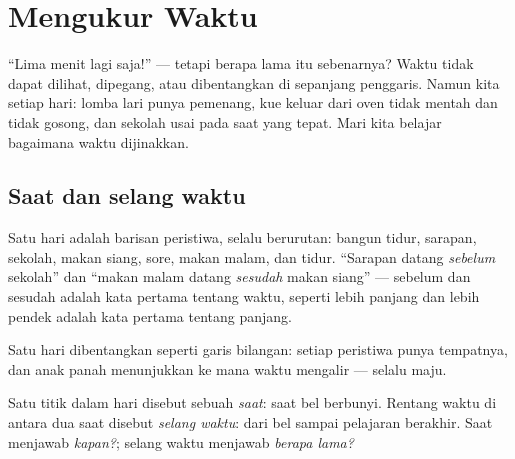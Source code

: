 \chapter{Mengukur Waktu}\label{ch:g2:measuring-time}

``Lima menit lagi saja!'' --- tetapi berapa lama itu sebenarnya? Waktu
tidak dapat dilihat, dipegang, atau dibentangkan di sepanjang
penggaris. Namun kita  setiap hari: lomba lari punya
pemenang, kue keluar dari oven tidak mentah dan tidak gosong, dan
sekolah usai pada saat yang tepat. Mari kita belajar bagaimana waktu
dijinakkan.

\section{Saat dan selang waktu}

\begin{example}\label{ex:g2:measuring-time:order}
Satu hari adalah barisan peristiwa, selalu berurutan: bangun tidur,
sarapan, sekolah, makan siang, sore, makan malam, dan tidur.
``Sarapan
datang \emph{sebelum} sekolah'' dan ``makan malam datang
\emph{sesudah} makan siang'' --- sebelum dan sesudah adalah kata
pertama tentang waktu, seperti lebih panjang dan lebih pendek adalah
kata pertama tentang panjang.
\end{example}

\begin{omfigure}

{\small Satu hari dibentangkan seperti garis bilangan: setiap
peristiwa punya tempatnya, dan anak panah menunjukkan ke mana waktu
mengalir --- selalu maju.}
\end{omfigure}

\begin{definition}\label{def:g2:measuring-time:duration}
Satu titik dalam hari disebut sebuah \emph{saat}: saat bel
berbunyi. Rentang waktu di antara dua saat disebut \emph{selang
waktu}: dari bel sampai pelajaran berakhir. Saat
menjawab \emph{kapan?}; selang waktu menjawab \emph{berapa lama?}
\end{definition}

